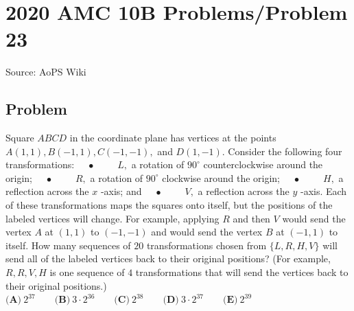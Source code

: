 \documentclass[12pt]{article}
\begin{document}
\section*{{2020 AMC 10B Problems/Problem 23}}
Source: AoPS Wiki

\subsection*{Problem}
Square $ABCD$ in the coordinate plane has vertices at the points $A(1,1), B(-1,1), C(-1,-1),$ and $D(1,-1).$ Consider the following four transformations: $\quad\bullet\qquad$ $L,$ a rotation of $90^{\circ}$ counterclockwise around the origin; $\quad\bullet\qquad$ $R,$ a rotation of $90^{\circ}$ clockwise around the origin; $\quad\bullet\qquad$ $H,$ a reflection across the $x$ -axis; and $\quad\bullet\qquad$ $V,$ a reflection across the $y$ -axis. Each of these transformations maps the squares onto itself, but the positions of the labeled vertices will change. For example, applying $R$ and then $V$ would send the vertex $A$ at $(1,1)$ to $(-1,-1)$ and would send the vertex $B$ at $(-1,1)$ to itself. How many sequences of $20$ transformations chosen from $\{L, R, H, V\}$ will send all of the labeled vertices back to their original positions? (For example, $R, R, V, H$ is one sequence of $4$ transformations that will send the vertices back to their original positions.) $\textbf{(A)}\ 2^{37} \qquad\textbf{(B)}\ 3\cdot 2^{36} \qquad\textbf{(C)}\ 2^{38} \qquad\textbf{(D)}\ 3\cdot 2^{37} \qquad\textbf{(E)}\ 2^{39}$
\end{document}
